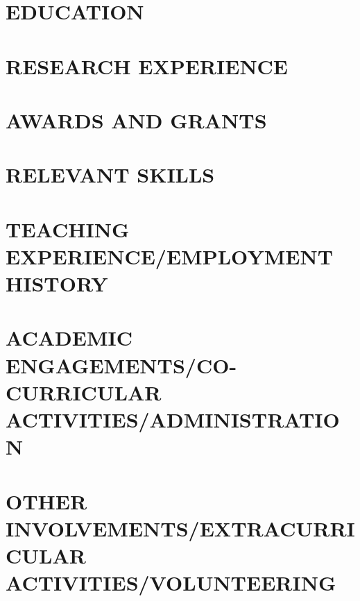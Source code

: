 \documentclass[10pt,a4paper]{article}
\begin{document}
	
	\section*{\textbf{\large EDUCATION}}
	
	\section*{\textbf{\large RESEARCH EXPERIENCE}} \vspace{-0.5cm}
	
	\section*{\textbf{\large AWARDS AND GRANTS}} \vspace{-0.5cm}
	
	\section*{\textbf{\large RELEVANT SKILLS}} \vspace{-0.55cm}
	
	\newpage
	\section*{\textbf{\large TEACHING EXPERIENCE/EMPLOYMENT HISTORY}} \vspace{-0.5cm}
	
	\section*{\textbf{\large ACADEMIC ENGAGEMENTS/CO-CURRICULAR ACTIVITIES/ADMINISTRATION}} \vspace{-0.5cm}
	
	
	\section*{\textbf{\large OTHER INVOLVEMENTS/EXTRACURRICULAR ACTIVITIES/VOLUNTEERING}} \vspace{-0.5cm}
	
	
	
\end{document}
